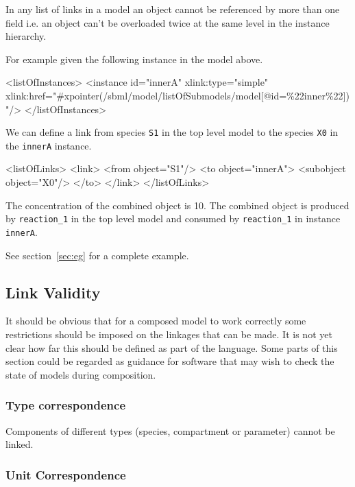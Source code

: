 \documentclass{cekarticle}
\begin{document}
In any list of links in a model an object cannot be referenced by more than one   field
i.e. an object can't be overloaded twice at the same level in the instance hierarchy.

For example given the following instance in the model above.

\begin{example}
<listOfInstances>
    <instance
        id="innerA"
        xlink:type="simple"
        xlink:href="#xpointer(/sbml/model/listOfSubmodels/model[@id=\%22inner\%22])"/>
</listOfInstances>
\end{example}

We can define a link from species \texttt{S1} in the top level model to the species \texttt{X0} in the \texttt{innerA} instance.

\begin{example}
<listOfLinks>
    <link>
        <from object="S1"/>
        <to object="innerA">
            <subobject object="X0"/>
        </to>
    </link>
</listOfLinks>
\end{example}

The concentration of the combined object is 10.  The combined object is produced by \texttt{reaction\_1} in the top level model and
consumed by \texttt{reaction\_1} in instance \texttt{innerA}.

See section~\ref{sec:eg} for a complete example.

\subsection{Link Validity}
\label{sec:linkvalidity}

It should be obvious that for a composed model to work correctly some restrictions
should be imposed on the linkages that can be made.  It is not yet clear how far this
should be defined as part of the language.  Some parts of this section could be regarded
as guidance for software that may wish to check the state of models during composition.

\subsubsection{Type correspondence}
\label{sec:typecorrespondence}

Components of different types (species, compartment or parameter) cannot
be linked.

\subsubsection{Unit Correspondence}
\label{sec:unitcorrespondence}
\end{document}
